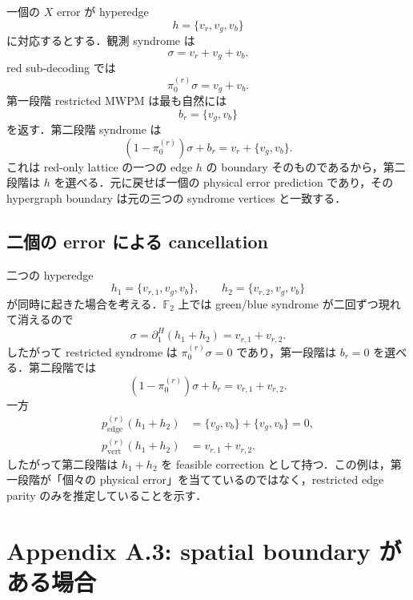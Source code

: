 \documentclass[a4paper,11pt]{ltjsarticle}
\newcommand{\F}{\mathbb{F}_2}
\newcommand{\bd}{\partial}
\begin{document}
一個の $X$ error が hyperedge
\begin{equation}
  h=\{v_r,v_g,v_b\}
\end{equation}
に対応するとする．観測 syndrome は
\begin{equation}
  \sigma=v_r+v_g+v_b.
\end{equation}
red sub-decoding では
\begin{equation}
 \pi_0^{(r)}\sigma=v_g+v_b.
\end{equation}
第一段階 restricted MWPM は最も自然には
\begin{equation}
  b_r=\{v_g,v_b\}
\end{equation}
を返す．第二段階 syndrome は
\begin{equation}
 (1-\pi_0^{(r)})\sigma+b_r=v_r+\{v_g,v_b\}.
\end{equation}
これは red-only lattice の一つの edge $h$ の boundary そのものであるから，第二段階は $h$ を選べる．元に戻せば一個の physical error prediction であり，その hypergraph boundary は元の三つの syndrome vertices と一致する．

\subsection{二個の error による cancellation}

二つの hyperedge
\begin{equation}
 h_1=\{v_{r,1},v_g,v_b\},\qquad
 h_2=\{v_{r,2},v_g,v_b\}
\end{equation}
が同時に起きた場合を考える．$\F$ 上では green/blue syndrome が二回ずつ現れて消えるので
\begin{equation}
 \sigma=\bd_1^H(h_1+h_2)=v_{r,1}+v_{r,2}.
\end{equation}
したがって restricted syndrome は $\pi_0^{(r)}\sigma=0$ であり，第一段階は $b_r=0$ を選べる．第二段階では
\begin{equation}
 (1-\pi_0^{(r)})\sigma+b_r=v_{r,1}+v_{r,2}.
\end{equation}
一方
\begin{align}
 p_{\mathrm{edge}}^{(r)}(h_1+h_2)
 &=\{v_g,v_b\}+\{v_g,v_b\}=0,\\
 p_{\mathrm{vert}}^{(r)}(h_1+h_2)
 &=v_{r,1}+v_{r,2}.
\end{align}
したがって第二段階は $h_1+h_2$ を feasible correction として持つ．この例は，第一段階が「個々の physical error」を当てているのではなく，restricted edge parity のみを推定していることを示す．

\section{Appendix A.3: spatial boundary がある場合}
\end{document}
